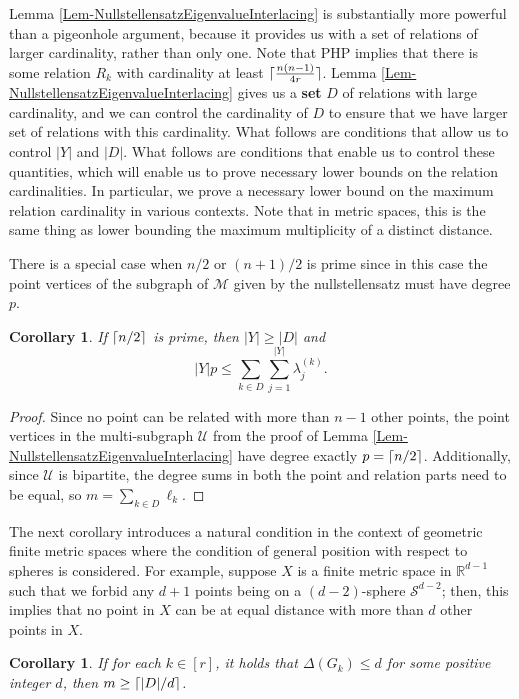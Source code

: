 \documentclass[12pt]{article}
\newcommand{\R}{\mathbb{R}}
\DeclarePairedDelimiter\ceil{\lceil}{\rceil}
\newtheorem{cor}[thm]{Corollary}
\theoremstyle{definition}
\begin{document}
	Lemma \ref{Lem-NullstellensatzEigenvalueInterlacing} is substantially more powerful than a pigeonhole argument, because it provides us with a set of relations of larger cardinality, rather than only one.  Note that PHP implies that there is some relation $R_k$ with cardinality at least $\ceil{\tfrac{n(n-1)}{4r}}$. Lemma \ref{Lem-NullstellensatzEigenvalueInterlacing} gives us a \textbf{set} $D$ of relations with large cardinality, and we can control the cardinality of $D$ to ensure that we have larger set of relations with this cardinality.  What follows are conditions that allow us to control $|Y|$ and $|D|$.  What follows are conditions that enable us to control these quantities, which will enable us to prove necessary lower bounds on the relation cardinalities.  In particular, we prove a necessary lower bound on the maximum relation cardinality in various contexts.  Note that in metric spaces, this is the same thing as lower bounding the maximum multiplicity of a distinct distance.
	
	There is a special case when $n/2$ or $(n+1)/2$ is prime since in this case the point vertices of the subgraph of $\mathcal{M}$ given by the nullstellensatz must have degree $p$.
	
	\begin{cor}
		If $\ceil{n/2}$ is prime, then $|Y| \geq |D|$ and 
		$$|Y| p \leq \sum_{k \in D}\sum_{j =1}^{|Y|}\lambda_j^{(k)}.$$
	\end{cor}
	\begin{proof}
		Since no point can be related with more than $n-1$ other points, the point vertices in the multi-subgraph $\mathcal{U}$ from the proof of Lemma \ref{Lem-NullstellensatzEigenvalueInterlacing} have degree exactly $p = \ceil{n/2}$.  Additionally, since $\mathcal{U}$ is bipartite, the degree sums in both the point and relation parts need to be equal, so $m = \sum_{k \in D}\ell_k$. \qedhere
	\end{proof}

	The next corollary introduces a natural condition in the context of geometric finite metric spaces where the condition of general position with respect to spheres is considered.  For example, suppose $X$ is a finite metric space in $\R^{d-1}$ such that we forbid any $d+1$ points being on a $(d-2)$-sphere $\mathcal{S}^{d-2}$; then, this implies that no point in $X$ can be at equal distance with more than $d$ other points in $X$.
	\begin{cor}
		If for each $k \in [r]$, it holds that $\Delta(G_k) \leq d$ for some positive integer $d$, then $m \geq \ceil{|D|/d}$.
	\end{cor}
	
\end{document}
